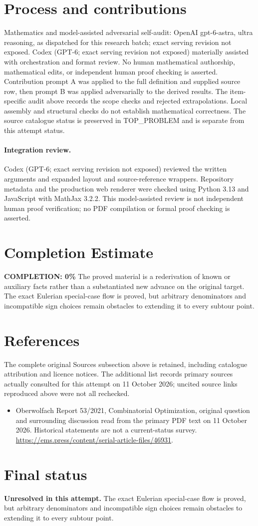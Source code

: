 \documentclass[11pt]{article}
\begin{document}
\section{Process and contributions}
Mathematics and model-assisted adversarial self-audit: OpenAI gpt-6-astra, ultra reasoning, as dispatched for this research batch; exact serving revision not exposed. Codex (GPT-6; exact serving revision not exposed) materially assisted with orchestration and format review. No human mathematical authorship, mathematical edits, or independent human proof checking is asserted.
Contribution prompt A was applied to the full definition and supplied source row, then prompt B was applied adversarially to the derived results. The item-specific audit above records the scope checks and rejected extrapolations. Local assembly and structural checks do not establish mathematical correctness. The source catalogue status is preserved in TOP\_PROBLEM and is separate from this attempt status.
\paragraph{Integration review.} Codex (GPT-6; exact serving revision not exposed) reviewed the written arguments and expanded layout and source-reference wrappers. Repository metadata and the production web renderer were checked using Python 3.13 and JavaScript with MathJax 3.2.2. This model-assisted review is not independent human proof verification; no PDF compilation or formal proof checking is asserted.

\section{Completion Estimate}
\noindent\textbf{COMPLETION: 0\%}
The proved material is a rederivation of known or auxiliary facts rather than a substantiated new advance on the original target. The exact Eulerian special-case flow is proved, but arbitrary denominators and incompatible sign choices remain obstacles to extending it to every subtour point.
\section{References}
The complete original Sources subsection above is retained, including catalogue attribution and licence notices. The additional list records primary sources actually consulted for this attempt on 11 October 2026; uncited source links reproduced above were not all rechecked.
\begin{itemize}
\item Oberwolfach Report 53/2021, Combinatorial Optimization, original question and surrounding discussion read from the primary PDF text on 11 October 2026. Historical statements are not a current-status survey. \url{https://ems.press/content/serial-article-files/46931}.
\end{itemize}
\section{Final status}
\textbf{Unresolved in this attempt.} The exact Eulerian special-case flow is proved, but arbitrary denominators and incompatible sign choices remain obstacles to extending it to every subtour point.
\end{document}
